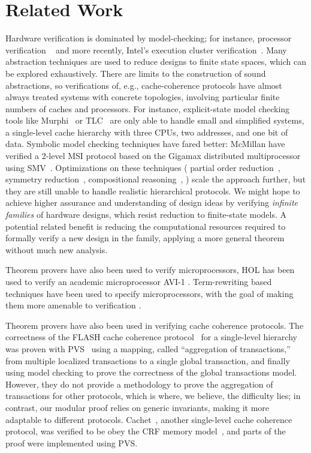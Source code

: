 ﻿\vspace{-.4cm}
\section{Related Work}
\label{relatedWork}

Hardware verification is dominated by model-checking; for instance, processor
verification ~\cite{burch1994automatic, mcmillan1998verification} and more
recently, Intel's execution cluster verification~\cite{kaivola2009replacing}.
Many abstraction techniques are used to reduce designs to finite state spaces,
which can be explored exhaustively. There are limits to the construction of
sound abstractions, so verifications of, e.g., cache-coherence protocols have
almost always treated systems with concrete topologies, involving particular
finite numbers of caches and processors. For instance, explicit-state model
checking tools like Murphi~\cite{murphi} or TLC~\cite{tlc} are only able to
handle small and simplified systems, \eg{} a single-level cache hierarchy with
three CPUs, two addresses, and one bit of data. Symbolic model checking
techniques have fared better: McMillan \etal{} have verified a 2-level MSI
protocol based on the Gigamax distributed multiprocessor using
SMV~\cite{gigamax}. Optimizations on these techniques (\eg{} partial order
reduction~\cite{part}, symmetry reduction~\cite{sym1, sym2}, compositional
reasoning~\cite{comp, Mccomp, mcc}, \etc{}) scale the approach further, but
they are still unable to handle realistic hierarchical protocols. We might hope
to achieve higher assurance and understanding of design ideas by verifying
\emph{infinite families} of hardware designs, which resist reduction to
finite-state models.  A potential related benefit is reducing the computational
resources required to formally verify a new design in the family, applying a
more general theorem without much new analysis.

Theorem provers have also been used to verify microprocessors, \eg{} HOL has
been used to verify an academic microprocessor AVI-1 \cite{windley1995formal}.
Term-rewriting based techniques have been used to specify microprocessors, with
the goal of making them more amenable to verification \cite{shen1999using}.

Theorem provers have also been used in verifying cache coherence protocols. The
correctness of the FLASH cache coherence protocol~\cite{flash} for a
single-level hierarchy was proven with PVS~\cite{park} using a mapping, called
``aggregation of transactions,'' from multiple localized transactions to a
single global transaction, and finally using model checking to prove the
correctness of the global transactions model. However, they do not provide a
methodology to prove the aggregation of transactions for other protocols, which
is where, we believe, the difficulty lies; in contrast, our modular proof
relies on generic invariants, making it more adaptable to different protocols.
Cachet~\cite{StoyShenArvind:Proofs}, another single-level cache coherence
protocol, was verified to be obey the CRF memory model~\cite{Shen:CRF}, and
parts of the proof were implemented using PVS.

